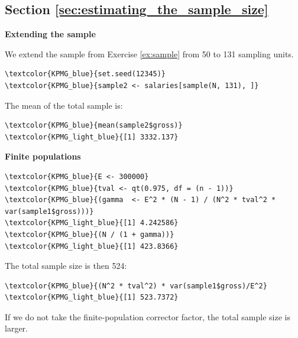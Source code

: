 \subsection{Section \ref{sec:estimating_the_sample_size}}

\begin{exercise}
\label{ex:extending_the_sample}

\textbf{Extending the sample}

We extend the sample from Exercise \ref{ex:sample} from 50 to 131 sampling units.

\begin{Verbatim}[commandchars=\\\{\}]
\textcolor{KPMG_blue}{set.seed(12345)}
\textcolor{KPMG_blue}{sample2 <- salaries[sample(N, 131), ]}
\end{Verbatim}

The mean of the total sample is:

\begin{Verbatim}[commandchars=\\\{\}]
\textcolor{KPMG_blue}{mean(sample2$gross)}
\textcolor{KPMG_light_blue}{[1] 3332.137}
\end{Verbatim}

\end{exercise}

\begin{exercise}
\label{ex:finite}

\textbf{Finite populations}

\begin{Verbatim}[commandchars=\\\{\}]
\textcolor{KPMG_blue}{E <- 300000}
\textcolor{KPMG_blue}{tval <- qt(0.975, df = (n - 1))}
\textcolor{KPMG_blue}{(gamma  <- E^2 * (N - 1) / (N^2 * tval^2 * var(sample1$gross)))}
\textcolor{KPMG_light_blue}{[1] 4.242586}
\textcolor{KPMG_blue}{(N / (1 + gamma))}
\textcolor{KPMG_light_blue}{[1] 423.8366}
\end{Verbatim}

The total sample size is then 524:

\begin{Verbatim}[commandchars=\\\{\}]
\textcolor{KPMG_blue}{(N^2 * tval^2) * var(sample1$gross)/E^2}
\textcolor{KPMG_light_blue}{[1] 523.7372}
\end{Verbatim}

If we do not take the finite-population corrector factor, the total sample size is larger.

\end{exercise}

